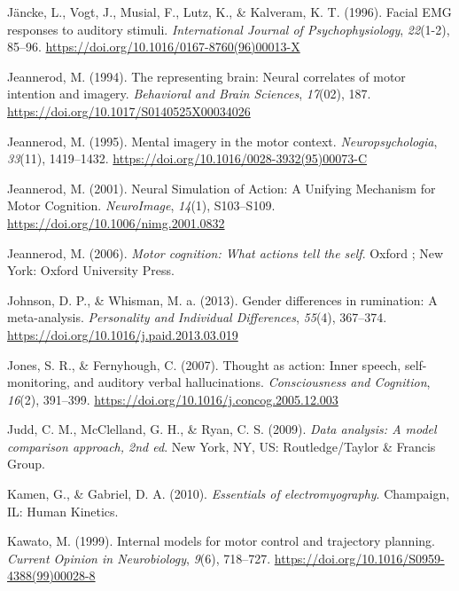 \documentclass[a4paper,12pt,twoside,openright,oldfontcommands]{memoir}
\begin{document}
\hypertarget{ref-Jancke1996}{}
Jäncke, L., Vogt, J., Musial, F., Lutz, K., \& Kalveram, K. T. (1996).
Facial EMG responses to auditory stimuli. \emph{International Journal of
Psychophysiology}, \emph{22}(1-2), 85--96.
\url{https://doi.org/10.1016/0167-8760(96)00013-X}

\hypertarget{ref-jeannerod_representing_1994}{}
Jeannerod, M. (1994). The representing brain: Neural correlates of motor
intention and imagery. \emph{Behavioral and Brain Sciences},
\emph{17}(02), 187. \url{https://doi.org/10.1017/S0140525X00034026}

\hypertarget{ref-jeannerod_mental_1995}{}
Jeannerod, M. (1995). Mental imagery in the motor context.
\emph{Neuropsychologia}, \emph{33}(11), 1419--1432.
\url{https://doi.org/10.1016/0028-3932(95)00073-C}

\hypertarget{ref-jeannerod_neural_2001}{}
Jeannerod, M. (2001). Neural Simulation of Action: A Unifying Mechanism
for Motor Cognition. \emph{NeuroImage}, \emph{14}(1), S103--S109.
\url{https://doi.org/10.1006/nimg.2001.0832}

\hypertarget{ref-jeannerod_motor_2006}{}
Jeannerod, M. (2006). \emph{Motor cognition: What actions tell the
self}. Oxford ; New York: Oxford University Press.

\hypertarget{ref-Johnson2013}{}
Johnson, D. P., \& Whisman, M. a. (2013). Gender differences in
rumination: A meta-analysis. \emph{Personality and Individual
Differences}, \emph{55}(4), 367--374.
\url{https://doi.org/10.1016/j.paid.2013.03.019}

\hypertarget{ref-Jones2007}{}
Jones, S. R., \& Fernyhough, C. (2007). Thought as action: Inner speech,
self-monitoring, and auditory verbal hallucinations. \emph{Consciousness
and Cognition}, \emph{16}(2), 391--399.
\url{https://doi.org/10.1016/j.concog.2005.12.003}

\hypertarget{ref-judd_data_2009}{}
Judd, C. M., McClelland, G. H., \& Ryan, C. S. (2009). \emph{Data
analysis: A model comparison approach, 2nd ed}. New York, NY, US:
Routledge/Taylor \& Francis Group.

\hypertarget{ref-kamen_essentials_2010}{}
Kamen, G., \& Gabriel, D. A. (2010). \emph{Essentials of
electromyography}. Champaign, IL: Human Kinetics.

\hypertarget{ref-kawato_internal_1999}{}
Kawato, M. (1999). Internal models for motor control and trajectory
planning. \emph{Current Opinion in Neurobiology}, \emph{9}(6), 718--727.
\url{https://doi.org/10.1016/S0959-4388(99)00028-8}
\end{document}
